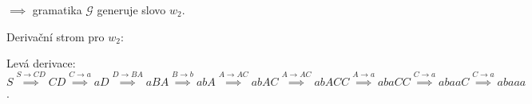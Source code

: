 \documentclass[11pt]{article}
\begin{document}
{        $\implies$ gramatika $\mathcal{G}$ generuje slovo $w_2$.   

        Derivační strom pro $w_2$:
        
        
        Levá derivace: $S \overset{S \rightarrow CD}{\implies} CD \overset{C \rightarrow a }{\implies} aD \overset{D \rightarrow BA }{\implies} {aBA \overset{B \rightarrow b }{\implies} abA \overset{A \rightarrow AC }{\implies} abAC \overset{A \rightarrow AC }{\implies} abACC} \overset{A \rightarrow a }{\implies} abaCC \overset{C \rightarrow a }{\implies} abaaC \overset{C \rightarrow a }{\implies} abaaa$.
}


 
\end{document}
